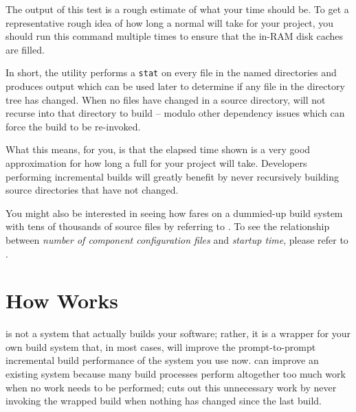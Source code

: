 \begin{center}\end{center}


The output of this test is a rough estimate of what your \nullbuild
time should be.  To get a representative rough idea of how long a
normal \nullbuild will take for your project, you should run this
command multiple times to ensure that the in-RAM disk caches are
filled.

In short, the \mtree utility performs a \texttt{stat} on every file in
the named directories and produces output which can be used later to
determine if any file in the directory tree has changed.  When no files
have changed in a source directory, \lmsbw will not recurse into that
directory to build -- modulo other dependency issues which can force
the build to be re-invoked.

What this means, for you, is that the elapsed time shown is a very
good approximation for how long a full \nullbuild for your project
will take.  Developers performing incremental builds will greatly
benefit by never recursively building source directories that have not
changed.

You might also be interested in seeing how \lmsbw fares on a
dummied-up build system with tens of thousands of source files by
referring to .  To see the relationship between
\emph{number of component configuration files} and \emph{\lmsbw
  startup time}, please refer to .

\section{How \lmsbw Works}

\lmsbw is not a system that actually builds your software; rather, it
is a wrapper for your own build system that, in most cases, will
improve the prompt-to-prompt incremental build performance of the
system you use now.  \lmsbw can improve an existing system because
many build processes perform altogether too much work when no work
needs to be performed; \lmsbw cuts out this unnecessary work by never
invoking the wrapped build when nothing has changed since the last
build.

